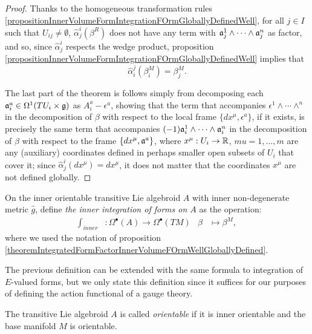 \begin{proof}
Thanks to the homogeneous transformation rules \ref{propositionInnerVolumeFormIntegrationFOrmGloballyDefinedWell}, for all $j \in I$ such that $U_{ij} \neq \emptyset$, $\hat \alpha^i_j(\beta^R)$ does not have any term with $\mathfrak{a}_j^1 \wedge \cdots \wedge \mathfrak{a}_j^n$ as factor, and so, since $\hat \alpha^i_j$ respects the wedge product, proposition \ref{propositionInnerVolumeFormIntegrationFOrmGloballyDefinedWell} implies that
\begin{equation}
    \hat \alpha^j_i(\beta^{M}_i) = \beta^{M}_j.
\end{equation}

The last part of the theorem is follows simply from decomposing each $\mathfrak{a}_i^a \in \Omega^1(TU_i \times \mathfrak{g})$ as $A_i^a - \epsilon^a$, showing that the term that accompanies $\epsilon^1 \wedge \cdots \wedge^n$ in the decomposition of $\beta$ with respect to the local frame $\{dx^\mu, \epsilon^a\}$, if it exists, is precisely the same term that accompanies $(-1)\mathfrak{a}_i^1 \wedge \cdots \wedge \mathfrak{a}_i^n$ in the decomposition of $\beta$ with respect to the frame $\{dx^\mu, \mathfrak{a}^a\}$, where $x^\mu: U_i\to \mathbb{R}$, $mu = 1, \dots , m$ are any (auxiliary) coordinates defined in perhaps smaller open subsets of $U_i$ that cover it; since $\hat \alpha^i_j(dx^\mu) = dx^\mu$, it does not matter that the coordinates $x^\mu$ are not defined globally.
\end{proof}


\begin{definition}\label{definitionInnerIntegration}
On the inner orientable transitive Lie algebroid $A$ with inner non-degenerate metric $\hat g$, define \emph{the inner integration of forms on $A$} as the operation:
\begin{align}
    \int_{inner} &: \Omega^\bullet(A) \to \Omega^\bullet(TM)
    & \beta &\mapsto \beta^M,
\end{align}
where we used the notation of proposition \ref{theoremIntegratedFormFactorInnerVolumeFOrmWellGloballyDefined}.
\end{definition}
The previous definition can be extended with the same formula to integration of $E$-valued forms, but we only state this definition since it suffices for our purposes of defining the action functional of a gauge theory.

\begin{definition}
The transitive Lie algebroid $A$ is called \emph{orientable} if it is inner orientable and the base manifold $M$ is orientable.
\end{definition}

